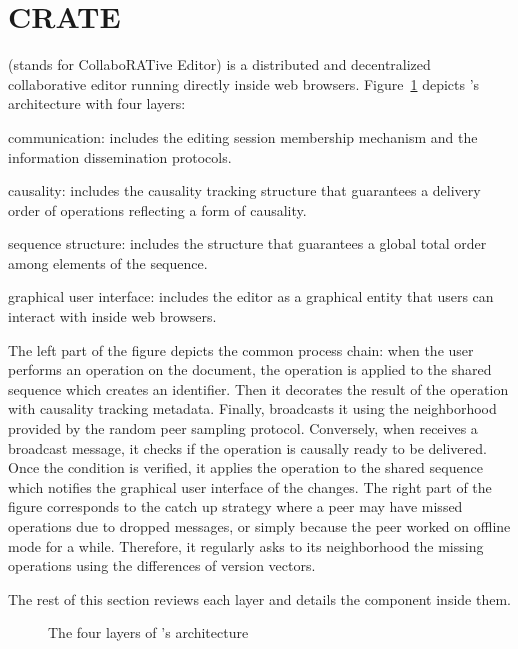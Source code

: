 
\section{CRATE}
\label{sec:proposal}

\CRATE (stands for CollaboRATive Editor) is a distributed and decentralized
collaborative editor running directly inside web browsers.
Figure~\ref{fig:architecture} depicts \CRATE's architecture with four layers:
\begin{inparaenum}[(i)]
\item communication: includes the editing session membership mechanism and the
  information dissemination protocols.
\item causality: includes the causality tracking structure that guarantees a
  delivery order of operations reflecting a form of causality.
\item sequence structure: includes the structure that guarantees a global
  total order among elements of the sequence.
\item graphical user interface: includes the editor as a graphical entity that
  users can interact with inside web browsers.
\end{inparaenum}
The left part of the figure depicts the common process chain: when the user
performs an operation on the document, the operation is applied to the shared
sequence which creates an \LSEQ identifier. Then it decorates the result of the
operation with causality tracking metadata. Finally, \CRATE broadcasts it using
the neighborhood provided by the \SPRAY random peer sampling protocol.
Conversely, when \CRATE receives a broadcast message, it checks if the operation
is causally ready to be delivered. Once the condition is verified, it applies
the operation to the shared sequence which notifies the graphical user interface
of the changes.  The right part of the figure corresponds to the catch up
strategy where a peer may have missed operations due to dropped messages, or
simply because the peer worked on offline mode for a while. Therefore, it
regularly asks to its neighborhood the missing operations using the differences
of version vectors.

The rest of this section reviews each layer and details the component inside
them.

\begin{figure}
  \centering
  
  \caption{\label{fig:architecture}The four layers of \CRATE's architecture}
\end{figure}

